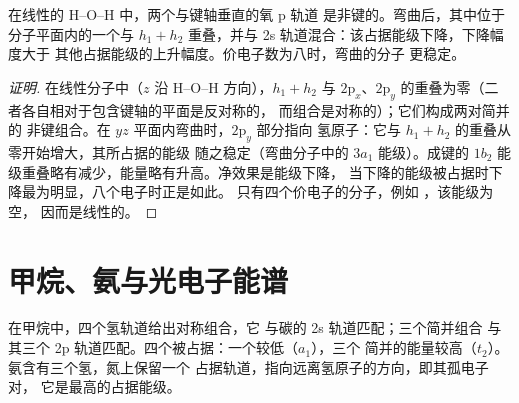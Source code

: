 \begin{proposition}[水为何呈弯曲形]\label{prop:b2:fragment-orbitals:bent-water}
在线性的 H--O--H 中，两个与键轴垂直的氧 p 轨道
是非键的。弯曲后，其中位于分子平面内的一个与
$h_1 + h_2$ 重叠，并与 2s 轨道混合：该占据能级下降，下降幅度大于
其他占据能级的上升幅度。价电子数为八时，弯曲的分子
更稳定。
\end{proposition}

\begin{proof}[证明]
在线性分子中（$z$ 沿 H--O--H 方向），$h_1 + h_2$ 与
$2\mathrm p_x$、$2\mathrm p_y$ 的重叠为零（二者各自相对于包含键轴的平面是反对称的，
而组合是对称的）；它们构成两对简并的
非键组合。在 $yz$ 平面内弯曲时，$2\mathrm p_y$ 部分指向
氢原子：它与 $h_1 + h_2$ 的重叠从零开始增大，其所占据的能级
随之稳定（弯曲分子中的 $3a_1$ 能级）。成键的
$1b_2$ 能级重叠略有减少，能量略有升高。净效果是能级下降，
当下降的能级被占据时下降最为明显，八个电子时正是如此。
只有四个价电子的分子，例如 ，该能级为空，
因而是线性的。
\end{proof}

\section{甲烷、氨与光电子能谱}

在甲烷中，四个氢轨道给出对称组合，它
与碳的 2s 轨道匹配；三个简并组合
与其三个 2p 轨道匹配。四个被占据：一个较低（$a_1$），三个
简并的能量较高（$t_2$）。氨含有三个氢，氮上保留一个
占据轨道，指向远离氢原子的方向，即其孤电子对，
它是最高的占据能级。

